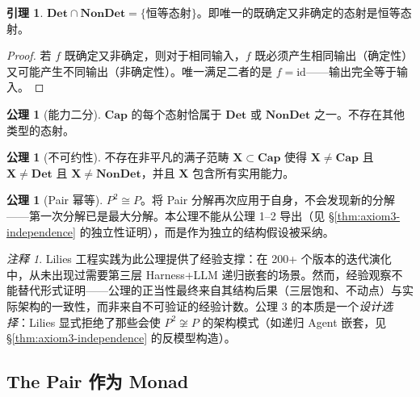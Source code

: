 \documentclass[11pt,a4paper]{article}
\theoremstyle{definition}
\newtheorem{lemma}[theorem]{引理}
\theoremstyle{definition}
\newtheorem{axiom}[theorem]{公理}
\theoremstyle{remark}
\newtheorem{remark}[theorem]{注释}
\newcommand{\cat}[1]{\mathbf{#1}}
\newcommand{\catCap}{\cat{Cap}}
\newcommand{\catDet}{\cat{Det}}
\newcommand{\catNonDet}{\cat{NonDet}}
\newcommand{\id}{\mathrm{id}}
\newcommand{\pairMonad}{P}
\begin{document}
\begin{lemma}
$\catDet \cap \catNonDet = \{\text{恒等态射}\}$。即唯一的既确定又非确定的态射是恒等态射。
\end{lemma}

\begin{proof}
若 $f$ 既确定又非确定，则对于相同输入，$f$ 既必须产生相同输出（确定性）又可能产生不同输出（非确定性）。唯一满足二者的是 $f = \id$——输出完全等于输入。
\end{proof}

\begin{axiom}[能力二分]
$\catCap$ 的每个态射恰属于 $\catDet$ 或 $\catNonDet$ 之一。不存在其他类型的态射。
\end{axiom}

\begin{axiom}[不可约性]
不存在非平凡的满子范畴 $\cat{X} \subset \catCap$ 使得 $\cat{X} \neq \catCap$ 且 $\cat{X} \neq \catDet$ 且 $\cat{X} \neq \catNonDet$，并且 $\cat{X}$ 包含所有实用能力。
\end{axiom}

\begin{axiom}[Pair 幂等]
$\pairMonad^2 \cong \pairMonad$。将 Pair 分解再次应用于自身，不会发现新的分解——第一次分解已是最大分解。本公理不能从公理 1--2 导出（见 \S\ref{thm:axiom3-independence} 的独立性证明），而是作为独立的结构假设被采纳。
\label{ax:pair-idempotent}
\end{axiom}

\begin{remark}
Lilies 工程实践为此公理提供了经验支撑：在 200+ 个版本的迭代演化中，从未出现过需要第三层 Harness+LLM 递归嵌套的场景。然而，经验观察不能替代形式证明——公理的正当性最终来自其结构后果（三层饱和、不动点）与实际架构的一致性，而非来自不可验证的经验计数。公理 3 的本质是一个\emph{设计选择}：Lilies 显式拒绝了那些会使 $P^2 \not\cong P$ 的架构模式（如递归 Agent 嵌套，见 \S\ref{thm:axiom3-independence} 的反模型构造）。
\end{remark}

\subsection{The Pair 作为 Monad}
\end{document}
